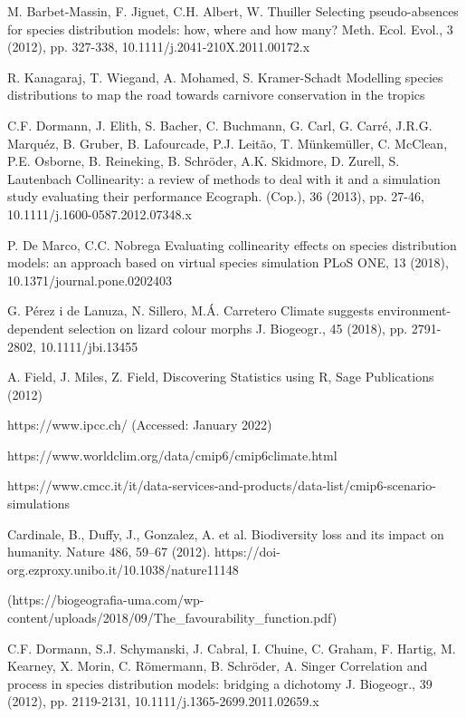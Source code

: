 \documentclass[12pt,a4paper]{article}
\begin{document}
\begin{thebibliography}{999}
M. Barbet-Massin, F. Jiguet, C.H. Albert, W. Thuiller
Selecting pseudo-absences for species distribution models: how, where and how many?
Meth. Ecol. Evol., 3 (2012), pp. 327-338, 10.1111/j.2041-210X.2011.00172.x

R. Kanagaraj, T. Wiegand, A. Mohamed, S. Kramer-Schadt
Modelling species distributions to map the road towards carnivore conservation in the tropics

C.F. Dormann, J. Elith, S. Bacher, C. Buchmann, G. Carl, G. Carré, J.R.G. Marquéz, B. Gruber, B. Lafourcade, P.J. Leitão, T. Münkemüller, C. McClean, P.E. Osborne, B. Reineking, B. Schröder, A.K. Skidmore, D. Zurell, S. Lautenbach
Collinearity: a review of methods to deal with it and a simulation study evaluating their performance
Ecograph. (Cop.), 36 (2013), pp. 27-46, 10.1111/j.1600-0587.2012.07348.x

P. De Marco, C.C. Nobrega
Evaluating collinearity effects on species distribution models: an approach based on virtual species simulation
PLoS ONE, 13 (2018), 10.1371/journal.pone.0202403

G. Pérez i de Lanuza, N. Sillero, M.Á. Carretero
Climate suggests environment-dependent selection on lizard colour morphs
J. Biogeogr., 45 (2018), pp. 2791-2802, 10.1111/jbi.13455

A. Field, J. Miles, Z. Field, Discovering Statistics using R, Sage Publications (2012)

https://www.ipcc.ch/ (Accessed: January 2022)

https://www.worldclim.org/data/cmip6/cmip6climate.html

https://www.cmcc.it/it/data-services-and-products/data-list/cmip6-scenario-simulations

Cardinale, B., Duffy, J., Gonzalez, A. et al. Biodiversity loss and its impact on humanity. Nature 486, 59–67 (2012). https://doi-org.ezproxy.unibo.it/10.1038/nature11148

(https://biogeografia-uma.com/wp-content/uploads/2018/09/The\_favourability\_function.pdf)

C.F. Dormann, S.J. Schymanski, J. Cabral, I. Chuine, C. Graham, F. Hartig, M. Kearney, X. Morin, C. Römermann, B. Schröder, A. Singer
Correlation and process in species distribution models: bridging a dichotomy
J. Biogeogr., 39 (2012), pp. 2119-2131, 10.1111/j.1365-2699.2011.02659.x


\end{thebibliography}
\end{document}
